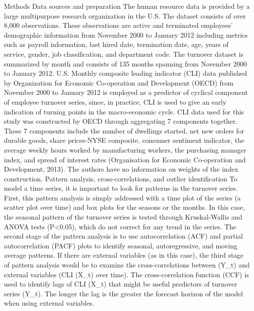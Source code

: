 Methods
Data sources and preparation
The human resource data is provided by a large multipurpose research organization in the U.S. The dataset consists of over 8,000 observations. These observations are active and terminated employees’ demographic information from November 2000 to January 2012 including metrics such as payroll information, last hired date, termination date, age, years of service, gender, job classification, and department code. The turnover dataset is summarized by month and consists of 135 months spanning from November 2000 to January 2012. 
U.S. Monthly composite leading indicator (CLI) data published by Organization for Economic Co-operation and Development (OECD) from November 2000 to January 2012 is employed as a predictor of cyclical component of employee turnover series, since, in practice, CLI is used to give an early indication of turning points in the macro-economic cycle. CLI data used for this study was constructed by OECD through aggregating 7 components together. These 7 components include the number of dwellings started, net new orders for durable goods, share prices-NYSE composite, consumer sentiment indicator, the average weekly hours worked by manufacturing workers, the purchasing manager index, and spread of interest rates (Organisation for Economic Co-operation and Development, 2013). The authors have no information on weights of the index construction.
Pattern analysis, cross-correlations, and outlier identification
To model a time series, it is important to look for patterns in the turnover series.  First, this pattern analysis is simply addressed with a time plot of the series (a scatter plot over time) and box plots for the seasons or the months. In this case, the seasonal pattern of the turnover series is tested through Kruskal-Wallis and ANOVA tests (P<0.05), which do not correct for any trend in the series. The second stage of the pattern analysis is to use autocorrelation (ACF) and partial autocorrelation (PACF) plots to identify seasonal, autoregressive, and moving average patterns. If there are external variables (as in this case), the third stage of pattern analysis would be to examine the cross-correlations between (Y_t) and external variables (CLI (X_t) over time). The cross-correlation function (CCF) is used to identify lags of CLI (X_t) that might be useful predictors of turnover series (Y_t).  The longer the lag is the greater the forecast horizon of the model when using external variables.
